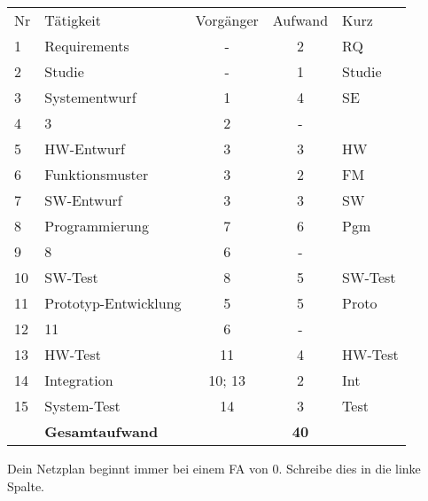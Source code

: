 \documentclass{beamer}
\begin{document}
\begin{frame}[t,shrink=65]
{    \begin{tabular}{l|lccl}
      \hline
      Nr & Tätigkeit        & Vorgänger & Aufwand & Kurz \\
      1  & Requirements     & -     & 2 & RQ \\
      2  & Studie           & -     & 1 & Studie \\
      3  & Systementwurf    & 1     & 4 & SE \\
      4  &   3              & 2     & - & \\
      5  & HW-Entwurf       & 3     & 3 & HW \\
      6  & Funktionsmuster  & 3     & 2 & FM \\
      7  & SW-Entwurf       & 3     & 3 & SW \\
      8  & Programmierung   & 7     & 6 & Pgm \\
      9  & 8                & 6     & - & \\
      10 & SW-Test          & 8     & 5 & SW-Test \\
      11 & Prototyp-Entwicklung & 5 & 5 & Proto \\
      12 & 11               & 6     & - & \\
      13 & HW-Test          & 11    & 4 & HW-Test \\
      14 & Integration      & 10; 13 & 2 & Int \\
      15 & System-Test      & 14    & 3 & Test \\
      \hline
        & \textbf{Gesamtaufwand} &   & \textbf{40} \\
    \end{tabular}
}

\par\vspace{1cm}\noindent %
\begin{itemize}

{\huge
    \item<only@+> {Dein Netzplan beginnt immer bei einem FA von 0. Schreibe dies in die linke Spalte.}

}
\end{itemize}
\end{frame}
\end{document}
